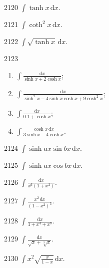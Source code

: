 \begin{prob}[S]{2120}
$\int \tanh x \,\mathrm{d}x$.
\end{prob}

\begin{prob}[S]{2121}
$\int \coth^2 x \,\mathrm{d}x$.
\end{prob}

\begin{prob}[S]{2122}
$\int \sqrt{\tanh x} \,\mathrm{d}x$.
\end{prob}

\begin{prob}[L]{2123}
\begin{enumerate}[label=(\alph*), itemsep=2pt, topsep=3pt]
  \item $\int \frac{\mathrm{d}x}{\sinh x + 2\cosh x}$;
  \item $\int \frac{\mathrm{d}x}{\sinh^2 x - 4\sinh x \cosh x + 9\cosh^2 x}$;
  \item $\int \frac{\mathrm{d}x}{0.1 + \cosh x}$;
  \item $\int \frac{\cosh x \,\mathrm{d}x}{3\sinh x - 4\cosh x}$.
\end{enumerate}
\end{prob}

\begin{prob}[S]{2124}
$\int \sinh ax \sin bx \,\mathrm{d}x$.
\end{prob}

\begin{prob}[S]{2125}
$\int \sinh ax \cos bx \,\mathrm{d}x$.
\end{prob}



\begin{prob}[S]{2126}
$\int \frac{\mathrm{d}x}{x^6(1 + x^2)}$.
\end{prob}

\begin{prob}[S]{2127}
$\int \frac{x^2 \,\mathrm{d}x}{(1 - x^2)^3}$.
\end{prob}

\begin{prob}[S]{2128}
$\int \frac{\mathrm{d}x}{1 + x^4 + x^8}$.
\end{prob}

\begin{prob}[S]{2129}
$\int \frac{\mathrm{d}x}{\sqrt{x} + \sqrt[3]{x}}$.
\end{prob}

\begin{prob}[S]{2130}
$\int x^2 \sqrt{\frac{x}{1 - x}} \,\mathrm{d}x$.
\end{prob}

